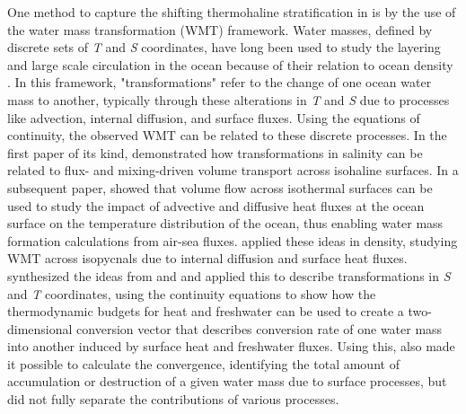 \documentclass[draft]{agujournal2019}
\begin{document}
One method to capture the shifting thermohaline stratification in is by the use of the water mass transformation (WMT) framework. Water masses, defined by discrete sets of \emph{T} and  \emph{S} coordinates, have long been used to study the layering and large scale circulation in the ocean because of their relation to ocean density \cite{sverdrup1942}. In this framework, "transformations" refer to the change of one ocean water mass to another, typically through these alterations in \emph{T} and \emph{S} due to processes like advection, internal diffusion, and surface fluxes. Using the equations of continuity, the observed WMT can be related to these discrete processes. In the first paper of its kind,  demonstrated how transformations in salinity can be related to flux- and mixing-driven volume transport across isohaline surfaces. In a subsequent paper,  showed that volume flow across isothermal surfaces can be used to study the impact of advective and diffusive heat fluxes at the ocean surface on the temperature distribution of the ocean, thus enabling water mass formation calculations from air-sea fluxes.  applied these ideas in density, studying WMT across isopycnals due to internal diffusion and surface heat fluxes.  synthesized the ideas from  and  and applied this to describe transformations in \emph{S} and \emph{T} coordinates, using the continuity equations to show how the thermodynamic budgets for heat and freshwater can be used to create a two-dimensional conversion vector that describes conversion rate of one water mass into another induced by surface heat and freshwater fluxes. Using this,  also made it possible to calculate the convergence, identifying the total amount of accumulation or destruction of a given water mass due to surface processes, but did not fully separate the contributions of various processes.
\end{document}

